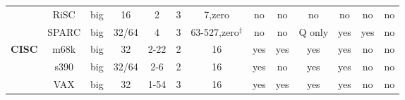 \begin{sidewaystable}[tbp]
\begin{sf}
\begin{footnotesize}
\begin{center}
\begin{tabular}{|c|c||c|c|c|c|c|c|c|c|c|c|c|}
                 & %
RiSC             & %
big              & %
16               & %
2                & %
3                & %
7,zero           & %
no               & %
no               & %
no               & %
no               & %
no               & %
no                 %
\\
\cline{2-13}

                 & %
SPARC            & %
big              & %
32/64            & %
4                & %
3                & %
63-527,zero$^{\ddagger}$ & %
no               & %
no               & %
Q only           & %
yes              & %
yes              & %
no                 %
\\

\hline\hline


\multirow{5}{*}{\bf CISC} &
m68k             & %
big              & %
32               & %
2-22             & %
2                & %
16               & %
yes              & %
yes              & %
yes              & %
yes              & %
no               & %
no                 %
\\
\cline{2-13}

		 & %
s390             & %
big              & %
32/64            & %
2-6              & %
2                & %
16               & %
yes              & %
no               & %
yes              & %
yes              & %
no               & %
no                 %
\\
\cline{2-13}

                 & %
VAX              & %
big              & %
32               & %
1-54             & %
3                & %
16               & %
yes              & %
yes              & %
yes              & %
yes              & %
no               & %
no                 %
\\
\cline{2-13}


\end{tabular}
\end{center}
\end{footnotesize}
\end{sf}
\end{sidewaystable}
